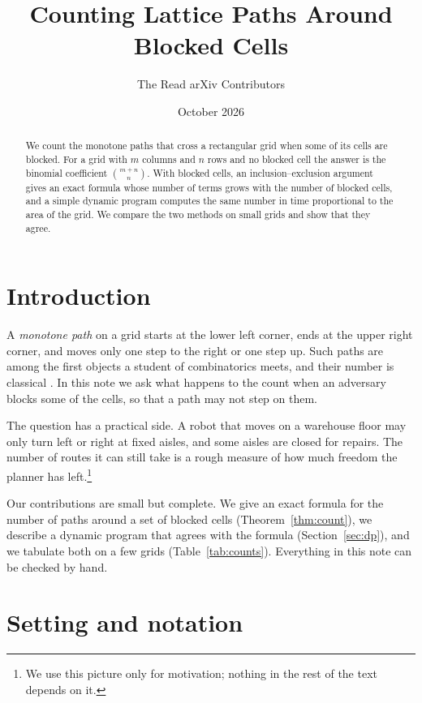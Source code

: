 \documentclass[11pt]{article}
\title{Counting Lattice Paths Around Blocked Cells}
\author{The Read arXiv Contributors}
\date{October 2026}
\theoremstyle{definition}
\begin{document}
\maketitle

\begin{abstract}
We count the monotone paths that cross a rectangular grid when some of its cells are blocked. For a grid with $m$ columns and $n$ rows and no blocked cell the answer is the binomial coefficient $\binom{m+n}{n}$. With blocked cells, an inclusion--exclusion argument gives an exact formula whose number of terms grows with the number of blocked cells, and a simple dynamic program computes the same number in time proportional to the area of the grid. We compare the two methods on small grids and show that they agree.
\end{abstract}

\section{Introduction}
\label{sec:intro}

A \emph{monotone path} on a grid starts at the lower left corner, ends at the upper right corner, and moves only one step to the right or one step up. Such paths are among the first objects a student of combinatorics meets, and their number is classical \cite{feller,stanley}. In this note we ask what happens to the count when an adversary blocks some of the cells, so that a path may not step on them.

The question has a practical side. A robot that moves on a warehouse floor may only turn left or right at fixed aisles, and some aisles are closed for repairs. The number of routes it can still take is a rough measure of how much freedom the planner has left.\footnote{We use this picture only for motivation; nothing in the rest of the text depends on it.}

Our contributions are small but complete. We give an exact formula for the number of paths around a set of blocked cells (Theorem~\ref{thm:count}), we describe a dynamic program that agrees with the formula (Section~\ref{sec:dp}), and we tabulate both on a few grids (Table~\ref{tab:counts}). Everything in this note can be checked by hand.

\section{Setting and notation}
\label{sec:setting}
\end{document}
